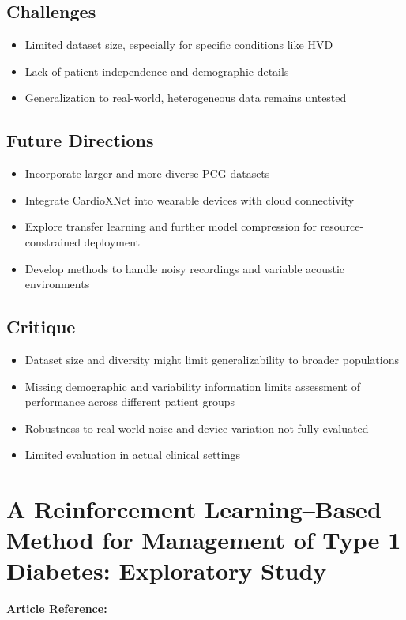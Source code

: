 \subsection*{Challenges}
\begin{itemize}
    \item Limited dataset size, especially for specific conditions like HVD
    \item Lack of patient independence and demographic details
    \item Generalization to real-world, heterogeneous data remains untested
\end{itemize}

\subsection*{Future Directions}
\begin{itemize}
    \item Incorporate larger and more diverse PCG datasets
    \item Integrate CardioXNet into wearable devices with cloud connectivity
    \item Explore transfer learning and further model compression for resource-constrained deployment
    \item Develop methods to handle noisy recordings and variable acoustic environments
\end{itemize}

\subsection*{Critique}
\begin{itemize}
    \item Dataset size and diversity might limit generalizability to broader populations
    \item Missing demographic and variability information limits assessment of performance across different patient groups
    \item Robustness to real-world noise and device variation not fully evaluated
    \item Limited evaluation in actual clinical settings
\end{itemize}

\section{A Reinforcement Learning–Based Method for Management of Type 1 Diabetes: Exploratory Study}
\textbf{Article Reference:} \cite{article_7}

